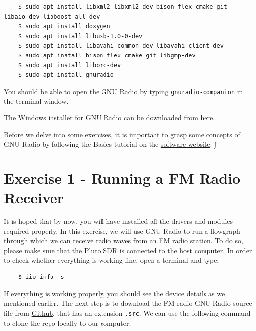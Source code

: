 \documentclass[11pt]{article}
\begin{document}
\begin{mdframed}[backgroundcolor=gray!20]
  \tiny
  \begin{verbatim}
    $ sudo apt install libxml2 libxml2-dev bison flex cmake git libaio-dev libboost-all-dev
    $ sudo apt install doxygen
    $ sudo apt install libusb-1.0-0-dev
    $ sudo apt install libavahi-common-dev libavahi-client-dev
    $ sudo apt install bison flex cmake git libgmp-dev
    $ sudo apt install liborc-dev
    $ sudo apt install gnuradio
  \end{verbatim}
\end{mdframed}

You should be able to open the GNU Radio by typing \texttt{gnuradio-companion} in the terminal window. 

\begin{tcolorbox}[colback=blue!5]
  The Windows installer for GNU Radio can be downloaded from \href{http://www.gcndevelopment.com/gnuradio/index.htm}{here}. 
\end{tcolorbox}

Before we delve into some exercises, it is important to grasp some concepts of GNU Radio by following the Basics tutorial on the \href{https://wiki.gnuradio.org/index.php/TutorialsCoreConcepts}{software website}. ∫

\section{Exercise 1 - Running a FM Radio Receiver}

It is hoped that by now, you will have installed all the drivers and modules required properly. In this exercise, we will use GNU Radio to run a flowgraph through which we can receive radio waves from an FM radio station. To do so, please make sure that the Pluto SDR is connected to the host computer. In order to check whether everything is working fine, open a terminal and type:

\begin{mdframed}[backgroundcolor=gray!20]
  \tiny
  \begin{verbatim}
    $ iio_info -s
  \end{verbatim}
\end{mdframed}
 
If everything is working properly, you should see the device details as we mentioned earlier. The next step is to download the FM radio GNU Radio source file from \href{https://github.com/hasantahir/GNU-Radio-Exercises}{Github}, that has an extension \texttt{.src}. We can use the following command to clone the repo locally to our computer:
\end{document}
